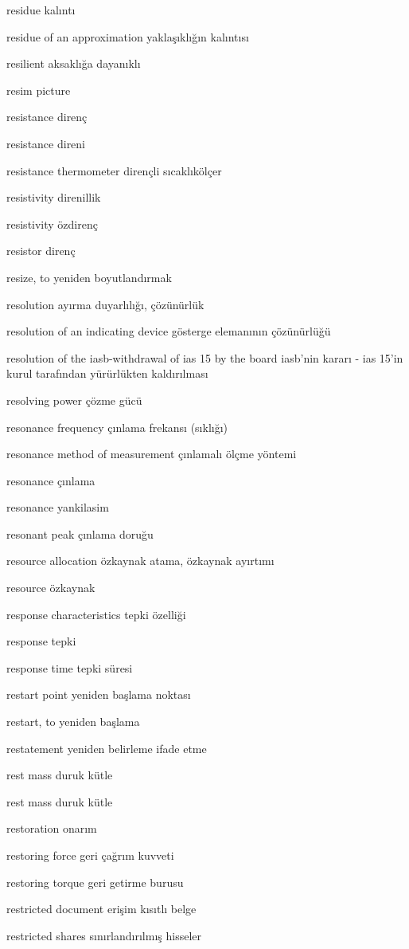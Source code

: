 \documentclass[12pt,fleqn]{article}\usepackage{../../common}
\begin{document}
residue kalıntı

residue of an approximation yaklaşıklığın kalıntısı

resilient aksaklığa dayanıklı

resim picture

resistance direnç

resistance direni

resistance thermometer dirençli sıcaklıkölçer

resistivity direnillik

resistivity özdirenç

resistor direnç

resize, to yeniden boyutlandırmak

resolution ayırma duyarlılığı, çözünürlük

resolution of an indicating device gösterge elemanının çözünürlüğü

resolution of the iasb-withdrawal of ias 15 by the board iasb'nin kararı - ias 15'in kurul tarafından yürürlükten kaldırılması

resolving power çözme gücü

resonance frequency çınlama frekansı (sıklığı)

resonance method of measurement çınlamalı ölçme yöntemi

resonance çınlama

resonance yankilasim

resonant peak çınlama doruğu

resource allocation özkaynak atama, özkaynak ayırtımı

resource özkaynak

response characteristics tepki özelliği

response tepki

response time tepki süresi

restart point yeniden başlama noktası

restart, to yeniden başlama

restatement yeniden belirleme ifade etme

rest mass duruk kütle

rest mass duruk kütle

restoration onarım

restoring force geri çağrım kuvveti

restoring torque geri getirme burusu

restricted document erişim kısıtlı belge

restricted shares sınırlandırılmış hisseler
\end{document}
